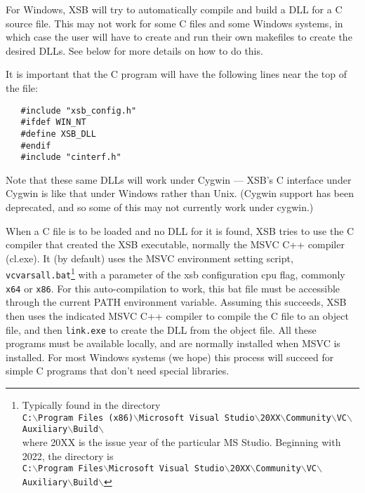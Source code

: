 For Windows, XSB will try to automatically compile and build a DLL for
a C source file.  This may not work for some C files and some Windows
systems, in which case the user will have to create and run their own
makefiles to create the desired DLLs.  See below for more details on
how to do this.

It is important that the C program will have the following lines near the
top of the file:
\begin{verbatim}
   #include "xsb_config.h"  
   #ifdef WIN_NT
   #define XSB_DLL
   #endif
   #include "cinterf.h"
\end{verbatim}

Note that these same DLLs will work under Cygwin --- XSB's C interface
under Cygwin is like that under Windows rather than Unix.  (Cygwin
support has been deprecated, and so some of this may not currently
work under cygwin.)

When a C file is to be loaded and no DLL for it is found, XSB tries to
use the C compiler that created the XSB executable, normally the MSVC
C++ compiler (cl.exe).  It (by default) uses the MSVC environment
setting script, {\tt vcvarsall.bat}\footnote{
  Typically found in the directory
  \\
  \texttt{C:$\backslash$Program Files (x86)$\backslash$Microsoft Visual Studio$\backslash$20XX$\backslash$Community$\backslash$VC$\backslash$Auxiliary$\backslash$Build$\backslash$}
  \\
  where 20XX is the issue year of the particular MS Studio.
  Beginning with 2022, the directory is
  \\
  \texttt{C:$\backslash$Program Files$\backslash$Microsoft Visual Studio$\backslash$20XX$\backslash$Community$\backslash$VC$\backslash$Auxiliary$\backslash$Build$\backslash$}
  }
with a parameter of the xsb
configuration cpu flag, commonly {\tt x64} or {\tt x86}.  For this
auto-compilation to work, this bat file must be accessible through the
current PATH environment variable.  Assuming this succeeds, XSB then
uses the indicated MSVC C++ compiler to compile the C file to an
object file, and then {\tt link.exe} to create the DLL from the object
file.  All these programs must be available locally, and are normally
installed when MSVC is installed.  For most Windows systems (we hope)
this process will succeed for simple C programs that don't need
special libraries.

